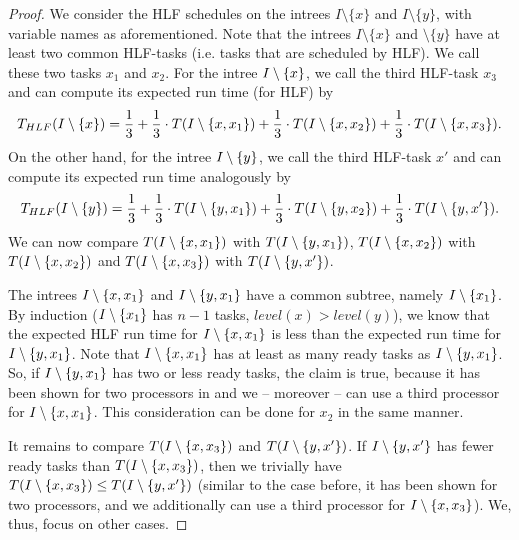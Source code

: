 \begin{proof}
  We consider the HLF schedules on the intrees $I\setminus \{x\}$ and $I \setminus \{y\}$, with variable names as aforementioned. Note that the intrees $I\setminus \{x\}$ and $\setminus \{y\}$ have at least two common HLF-tasks (i.e. tasks that are scheduled by HLF). We call these two tasks $x_1$ and $x_2$. For the intree $I\setminus\{x\}$, we call the third HLF-task $x_3$ and can compute its expected run time (for HLF) by
  \begin{equation*}
    T_{HLF}(I\setminus\{x\}) = 
    \frac{1}{3} +
    \frac{1}{3} \cdot T(I\setminus\{x, x_1\}) +
    \frac{1}{3} \cdot T(I\setminus\{x, x_2\}) +
    \frac{1}{3} \cdot T(I\setminus\{x, x_3\})
    .
  \end{equation*}
  On the other hand, for the intree $I\setminus\{y\}$, we call the third HLF-task $x'$ and can compute its expected run time analogously by
  \begin{equation*}
    T_{HLF}(I\setminus\{y\}) = 
    \frac{1}{3} +
    \frac{1}{3} \cdot T(I\setminus\{y, x_1\}) +
    \frac{1}{3} \cdot T(I\setminus\{y, x_2\}) +
    \frac{1}{3} \cdot T(I\setminus\{y, x'\})
    .
  \end{equation*}
  We can now compare $T(I\setminus\{x, x_1\})$ with $T(I\setminus\{y, x_1\})$, $T(I\setminus\{x, x_2\})$ with $T(I\setminus\{x, x_2\})$ and $T(I\setminus\{x, x_3\})$ with $T(I\setminus\{y, x'\})$.
  
  The intrees $I\setminus\{x,x_1\}$ and $I\setminus\{y,x_1\}$ have a common subtree, namely $I\setminus\{x_1\}$. By induction ($I\setminus\{x_1\}$ has $n-1$ tasks, $level(x) > level(y)$), we know that the expected HLF run time for $I\setminus\{x,x_1\}$ is less than the expected run time for $I\setminus\{y,x_1\}$. Note that $I\setminus\{x, x_1\}$ has at least as many ready tasks as $I\setminus\{y,x_1\}$. So, if $I\setminus\{y,x_1\}$ has two or less ready tasks, the claim is true, because it has been shown for two processors in \cite{chandyreynoldsshortpaper1975} and we -- moreover -- can use a third processor for $I\setminus\{x,x_1\}$. This consideration can be done for $x_2$ in the same manner. 

  It remains to compare $T(I\setminus\{x, x_3\})$ and $T(I\setminus\{y, x'\})$. If $I\setminus\{y,x'\}$ has fewer ready tasks than $T(I\setminus\{x, x_3\})$, then we trivially have $T(I\setminus\{x, x_3\}) \leq T(I\setminus\{y, x'\})$ (similar to the case before, it has been shown for two processors, and we additionally can use a third processor for $I\setminus\{x,x_3\}$). We, thus, focus on other cases.


\end{proof}
